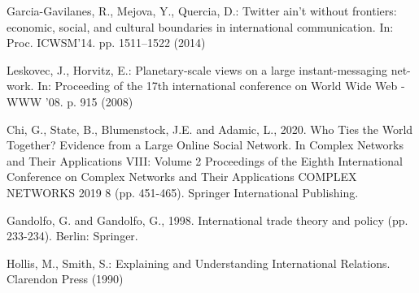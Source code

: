 \documentclass[12pt]{article}
\begin{document}
Garcia-Gavilanes, R., Mejova, Y., Quercia, D.: Twitter ain’t without frontiers:
economic, social, and cultural boundaries in international communication. In: Proc.
ICWSM’14. pp. 1511–1522 (2014)

Leskovec, J., Horvitz, E.: Planetary-scale views on a large instant-messaging net-
work. In: Proceeding of the 17th international conference on World Wide Web -
WWW ’08. p. 915 (2008)

Chi, G., State, B., Blumenstock, J.E. and Adamic, L., 2020. Who Ties the World Together? Evidence from a Large Online Social Network. In Complex Networks and Their Applications VIII: Volume 2 Proceedings of the Eighth International Conference on Complex Networks and Their Applications COMPLEX NETWORKS 2019 8 (pp. 451-465). Springer International Publishing.

Gandolfo, G. and Gandolfo, G., 1998. International trade theory and policy (pp. 233-234). Berlin: Springer.

Hollis, M., Smith, S.: Explaining and Understanding International Relations.
Clarendon Press (1990)
\end{document}
